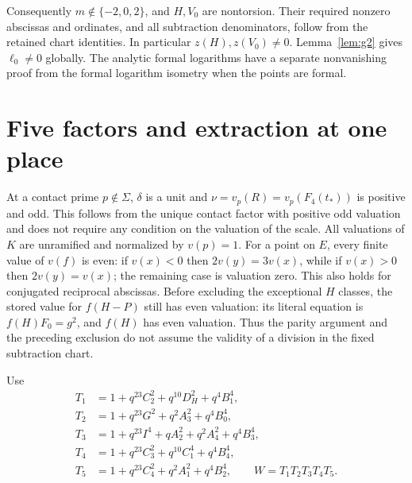 \documentclass[11pt,a4paper]{article}
\begin{document}
Consequently $m\notin\{-2,0,2\}$, and $H,V_0$ are nontorsion. Their required
nonzero abscissas and ordinates, and all subtraction denominators,
follow from the retained chart identities. In particular
$z(H),z(V_0)\ne0$. Lemma~\ref{lem:g2} gives $\ell_0\ne0$ globally.
The analytic formal logarithms have a separate nonvanishing proof
from the formal logarithm isometry when the points are formal.

\section{Five factors and extraction at one place}
At a contact prime $p\notin\Sigma$, $\delta$ is a unit and
$\nu=v_p(R)=v_p(F_4(t_*))$ is positive and odd. This follows
from the unique contact factor with positive odd valuation and
does not require any condition on the valuation of the scale. All valuations
of $K$ are unramified and normalized by $v(p)=1$.
For a point on $E$, every finite value of $v(f)$ is even: if
$v(x)<0$ then $2v(y)=3v(x)$, while if $v(x)>0$ then
$2v(y)=v(x)$; the remaining case is valuation zero.
This also holds for conjugated reciprocal abscissas. Before excluding
the exceptional $H$ classes, the stored value for $f(H-P)$ still has even
valuation: its literal equation is $f(H)F_0=g^2$, and $f(H)$ has even
valuation. Thus the parity argument and the preceding exclusion do not
assume the validity of a division in the fixed subtraction chart.

Use
\begin{align*}
 T_1&=1+q^{23}C_2^2+q^{10}D_H^2+q^4B_1^4,\\
 T_2&=1+q^{23}G^2+q^2A_3^2+q^4B_0^4,\\
 T_3&=1+q^{23}I^4+qA_2^2+q^2A_4^2+q^4B_3^4,\\
 T_4&=1+q^{23}C_3^2+q^{10}C_1^4+q^4B_4^4,\\
 T_5&=1+q^{23}C_4^2+q^2A_1^2+q^4B_2^4,
 \qquad W=T_1T_2T_3T_4T_5.
\end{align*}
\end{document}
